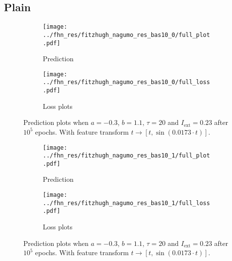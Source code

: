 \documentclass[a4paper]{article}
\begin{document}
	

\subsection{Plain}

\begin{figure}[H]
	\centering 
	\begin{subfigure}[b]{\textwidth}
		\centering
		\texttt{[image: ../fhn\_res/fitzhugh\_nagumo\_res\_bas10\_0/full\_plot.pdf]}
		\caption{Prediction}
		\label{fig:justb06a}
	\end{subfigure}
	\begin{subfigure}[b]{\textwidth}
		\centering
		\texttt{[image: ../fhn\_res/fitzhugh\_nagumo\_res\_bas10\_0/full\_loss.pdf]}
		\caption{Loss plots}
		\label{fig:justb06b}
	\end{subfigure}
	\caption{Prediction plots when $a=-0.3$, $b=1.1$, $\tau=20$ and $ I_{\text{ext}}=0.23$ after $10^5$ epochs. With feature transform $t \rightarrow \left[ t, \sin(0.0173\cdot t) \right] $.}%
\label{plot:justb06}
\end{figure} 	

\begin{figure}[H]
	\centering 
	\begin{subfigure}[b]{\textwidth}
		\centering
		\texttt{[image: ../fhn\_res/fitzhugh\_nagumo\_res\_bas10\_1/full\_plot.pdf]}
		\caption{Prediction}
		\label{fig:justb015}
	\end{subfigure}
	\begin{subfigure}[b]{\textwidth}
		\centering
		\texttt{[image: ../fhn\_res/fitzhugh\_nagumo\_res\_bas10\_1/full\_loss.pdf]}
		\caption{Loss plots}
		\label{fig:justb05b}
	\end{subfigure}
	\caption{Prediction plots when $a=-0.3$, $b=1.1$, $\tau=20$ and $ I_{\text{ext}}=0.23$ after $10^5$ epochs. With feature transform $t \rightarrow \left[ t, \sin(0.0173\cdot t) \right] $.}%
\label{plot:justb05}
\end{figure} 	
\end{document}
